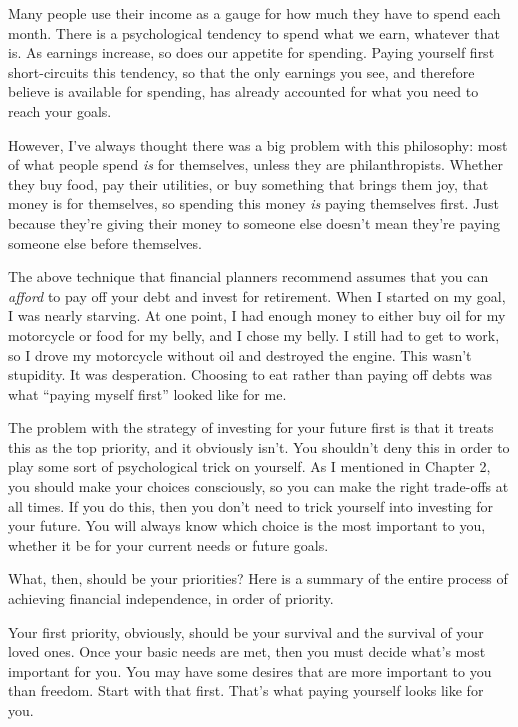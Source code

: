 Many people use their income as a gauge for how much they have to spend each month. There is a psychological tendency to spend what we earn, whatever that is. As earnings increase, so does our appetite for spending. Paying yourself first short-circuits this tendency, so that the only earnings you see, and therefore believe is available for spending, has already accounted for what you need to reach your goals.

However, I've always thought there was a big problem with this philosophy: most of what people spend \emph{is} for themselves, unless they are philanthropists. Whether they buy food, pay their utilities, or buy something that brings them joy, that money is for themselves, so spending this money \emph{is} paying themselves first. Just because they're giving their money to someone else doesn't mean they're paying someone else before themselves.

The above technique that financial planners recommend assumes that you can \emph{afford} to pay off your debt and invest for retirement. When I started on my goal, I was nearly starving. At one point, I had enough money to either buy oil for my motorcycle or food for my belly, and I chose my belly. I still had to get to work, so I drove my motorcycle without oil and destroyed the engine. This wasn't stupidity. It was desperation. Choosing to eat rather than paying off debts was what ``paying myself first'' looked like for me.

The problem with the strategy of investing for your future first is that it treats this as the top priority, and it obviously isn't. You shouldn't deny this in order to play some sort of psychological trick on yourself. As I mentioned in Chapter 2, you should make your choices consciously, so you can make the right trade-offs at all times. If you do this, then you don't need to trick yourself into investing for your future. You will always know which choice is the most important to you, whether it be for your current needs or future goals.

What, then, should be your priorities? Here is a summary of the entire process of achieving financial independence, in order of priority.

Your first priority, obviously, should be your survival and the survival of your loved ones. Once your basic needs are met, then you must decide what's most important for you. You may have some desires that are more important to you than freedom. Start with that first. That's what paying yourself looks like for you.

